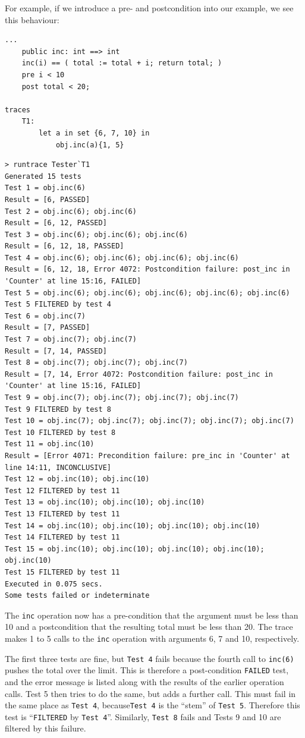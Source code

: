 \documentclass{overturerepchap}
\begin{document}
For example, if we introduce a pre- and postcondition into our example, we see
this behaviour:

\small
\begin{lstlisting}
...
    public inc: int ==> int
    inc(i) == ( total := total + i; return total; )
    pre i < 10
    post total < 20;

traces
    T1:
        let a in set {6, 7, 10} in
            obj.inc(a){1, 5}
\end{lstlisting}

\scriptsize
\lstset{style=tool,language=}
\begin{lstlisting}[escapechar=@]
> runtrace Tester`T1
Generated 15 tests
Test 1 = obj.inc(6)
Result = [6, PASSED]
Test 2 = obj.inc(6); obj.inc(6)
Result = [6, 12, PASSED]
Test 3 = obj.inc(6); obj.inc(6); obj.inc(6)
Result = [6, 12, 18, PASSED]
Test 4 = obj.inc(6); obj.inc(6); obj.inc(6); obj.inc(6)
Result = [6, 12, 18, Error 4072: Postcondition failure: post_inc in 'Counter' at line 15:16, FAILED]
Test 5 = obj.inc(6); obj.inc(6); obj.inc(6); obj.inc(6); obj.inc(6)
Test 5 FILTERED by test 4
Test 6 = obj.inc(7)
Result = [7, PASSED]
Test 7 = obj.inc(7); obj.inc(7)
Result = [7, 14, PASSED]
Test 8 = obj.inc(7); obj.inc(7); obj.inc(7)
Result = [7, 14, Error 4072: Postcondition failure: post_inc in 'Counter' at line 15:16, FAILED]
Test 9 = obj.inc(7); obj.inc(7); obj.inc(7); obj.inc(7)
Test 9 FILTERED by test 8
Test 10 = obj.inc(7); obj.inc(7); obj.inc(7); obj.inc(7); obj.inc(7)
Test 10 FILTERED by test 8
Test 11 = obj.inc(10)
Result = [Error 4071: Precondition failure: pre_inc in 'Counter' at line 14:11, INCONCLUSIVE]
Test 12 = obj.inc(10); obj.inc(10)
Test 12 FILTERED by test 11
Test 13 = obj.inc(10); obj.inc(10); obj.inc(10)
Test 13 FILTERED by test 11
Test 14 = obj.inc(10); obj.inc(10); obj.inc(10); obj.inc(10)
Test 14 FILTERED by test 11
Test 15 = obj.inc(10); obj.inc(10); obj.inc(10); obj.inc(10); obj.inc(10)
Test 15 FILTERED by test 11
Executed in 0.075 secs. 
Some tests failed or indeterminate
\end{lstlisting}
\lstset{style=mystyle}
\lstset{language=VDM++}
\normalsize

The \texttt{inc} operation now has a pre-condition that the argument must be
less than 10 and a postcondition that the resulting total must be less than 20.
The trace makes 1 to 5 calls to the \texttt{inc} operation with arguments 6, 7
and 10, respectively.

The first three tests are fine, but \texttt{Test 4} fails because the fourth call to
\texttt{inc(6)} pushes the total over the limit. This is therefore a
post-condition \texttt{FAILED} test, and the error message is listed along with the
results of the earlier operation calls. Test 5 then tries to do the same, but
adds a further call. This must fail in the same place as \texttt{Test 4}, because\texttt{Test 4}
is the ``stem'' of \texttt{Test 5}. Therefore this test is ``\texttt{FILTERED} by \texttt{Test 4}''.
Similarly, \texttt{Test 8} fails and Tests 9 and 10 are filtered by this failure.
\end{document}
